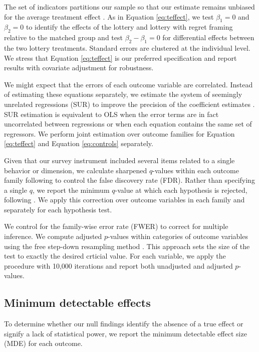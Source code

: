 \documentclass[11pt]{article}
\begin{document}
		The set of indicators partitions our sample so that our estimate remains unbiased for the average treatment effect . As in Equation \ref{eq:teffect}, we test $\beta_{1} = 0$ and $\beta_{2} = 0$ to identify the effects of the lottery and lottery with regret framing relative to the matched group and test $\beta_{2} - \beta_{1} = 0$ for differential effects between the two lottery treatments. Standard errors are clustered at the individual level. We stress that Equation \ref{eq:teffect} is our preferred specification and report results with covariate adjustment for robustness.

		We might expect that the errors of each outcome variable are correlated. Instead of estimating these equations separately, we estimate the system of seemingly unrelated regressions (SUR) to improve the precision of the coefficient estimates . SUR estimation is equivalent to OLS when the error terms are in fact uncorrelated between regressions or when each equation contains the same set of regressors. We perform joint estimation over outcome families for Equation \ref{eq:teffect} and Equation \ref{eq:controls} separately.

		Given that our survey instrument included several items related to a single behavior or dimension, we calculate sharpened $q$-values within each outcome family following  to control the false discovery rate (FDR). Rather than specifying a single $q$, we report the minimum $q$-value at which each hypothesis is rejected, following . We apply this correction over outcome variables in each family and separately for each hypothesis test.

		We control for the family-wise error rate (FWER) to correct for multiple inference. We compute adjusted $p$-values within categories of outcome variables using the free step-down resampling method . This approach sets the size of the test to exactly the desired crticial value. For each variable, we apply the procedure with 10,000 iterations and report both unadjusted and adjusted $p$-values.

	\subsection{Minimum detectable effects}

		To determine whether our null findings identify the absence of a true effect or signify a lack of statistical power, we report the minimum detectable effect size (MDE) for each outcome.
\end{document}

